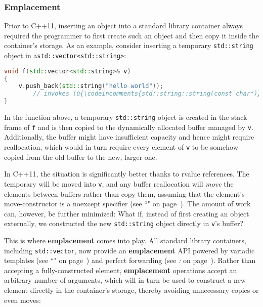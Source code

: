 \subsubsection[Emplacement]{Emplacement}\label{emplacement}

Prior to C++11, inserting an object into a standard library container
always required the programmer to first create such an object and then
copy it inside the container's storage. As an example, consider
inserting a temporary \texttt{std::string} object in a\linebreak[4]
\mbox{\texttt{std::vector<std::string>}}:

\begin{lstlisting}[language=C++]
void f(std::vector<std::string>& v)
{
    v.push_back(std::string("hello world"));
        // invokes (ù{\codeincomments{std::string::string(const char*)}}ù) and the copy-constructor
}
\end{lstlisting}

\noindent In the function above, a temporary \texttt{std::string} object is
created in the stack frame of \texttt{f} and is then copied to the
dynamically allocated buffer managed by \texttt{v}. Additionally, the
buffer might have insufficient capacity and hence might require
reallocation, which would in turn require every element of \texttt{v} to
be somehow copied from the old buffer to the new, larger one.

In C++11, the situation is significantly better thanks to
rvalue references. The temporary will be moved into
\texttt{v}, and any buffer reallocation will \emph{move} the elements
between buffers rather than copy them, assuming that the element's
move-constructor is a noexcept specifier (see ``" on page~\pageref{noexcept-specifier}). The amount of work
can, however, be further minimized: What if, instead of first creating
an object externally, we constructed the new \texttt{std::string} object
directly in \texttt{v}'s buffer?

This is where \textbf{emplacement} comes into play. All standard library
containers, including \texttt{std::vector}, now provide an
\textbf{emplacement} API powered by variadic templates (see ``" on page~\pageref{variadictemplate})
and perfect forwarding (see \textit{: } on page~\pageref{perfect-forwarding-for-generic-factory-functions}). Rather than accepting a
fully-constructed element, \textbf{emplacement} operations accept an
arbitrary number of arguments, which will in turn be used to construct a
new element directly in the container's storage, thereby avoiding
unnecessary copies or even moves:

